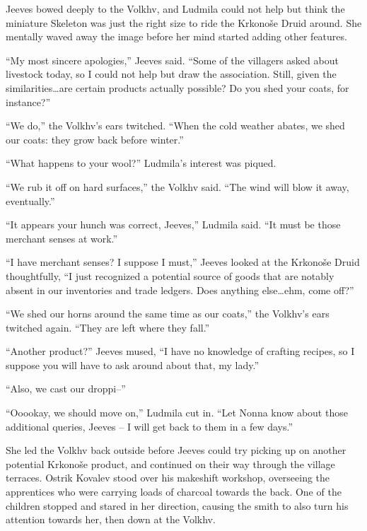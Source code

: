 Jeeves bowed deeply to the Volkhv, and Ludmila could not help but think the miniature Skeleton was just the right size to ride the Krkonoše Druid around. She mentally waved away the image before her mind started adding other features.

 

“My most sincere apologies,” Jeeves said. “Some of the villagers asked about livestock today, so I could not help but draw the association. Still, given the similarities…are certain products actually possible? Do you shed your coats, for instance?”

 

“We do,” the Volkhv’s ears twitched. “When the cold weather abates, we shed our coats: they grow back before winter.”

 

“What happens to your wool?” Ludmila’s interest was piqued.

 

“We rub it off on hard surfaces,” the Volkhv said. “The wind will blow it away, eventually.”

 

“It appears your hunch was correct, Jeeves,” Ludmila said. “It must be those merchant senses at work.”

 

“I have merchant senses? I suppose I must,” Jeeves looked at the Krkonoše Druid thoughtfully, “I just recognized a potential source of goods that are notably absent in our inventories and trade ledgers. Does anything else…ehm, come off?”

 

“We shed our horns around the same time as our coats,” the Volkhv’s ears twitched again. “They are left where they fall.”

 

“Another product?” Jeeves mused, “I have no knowledge of crafting recipes, so I suppose you will have to ask around about that, my lady.”

 

“Also, we cast our droppi–”

 

“Ooookay, we should move on,” Ludmila cut in. “Let Nonna know about those additional queries, Jeeves – I will get back to them in a few days.”

 

She led the Volkhv back outside before Jeeves could try picking up on another potential Krkonoše product, and continued on their way through the village terraces. Ostrik Kovalev stood over his makeshift workshop, overseeing the apprentices who were carrying loads of charcoal towards the back. One of the children stopped and stared in her direction, causing the smith to also turn his attention towards her, then down at the Volkhv.

